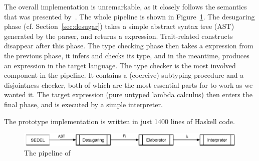 The overall implementation is unremarkable, as it closely follows the semantics
that was presented by~\citet{alpuimdisjoint}. The whole pipeline is shown in
Figure~\ref{fig:pipeline}. The desugaring phase (cf. Section~\ref{sec:desugar})
takes a simple abstract syntax tree (AST) generated by the parser, and returns a
\bname expression. Trait-related constructs disappear after this phase. The
type checking phase then takes a \bname expression from the previous phase, it
infers and checks its type, and in the meantime, produces an expression in the
target language. The type checker is the most involved component in the
pipeline. It contains a (coercive) subtyping procedure and a disjointness
checker, both of which are the most essential parts for \name to work as we
wanted it. The target expression (pure untyped lambda calculus) then enters the
final phase, and is executed by a simple interpreter.

The prototype implementation is written in just 1400 lines of Haskell code.

\begin{figure}
  \centering
  \includegraphics[scale=0.9]{pipeline.eps}
  \caption{The pipeline of \name}
  \label{fig:pipeline}
\end{figure}